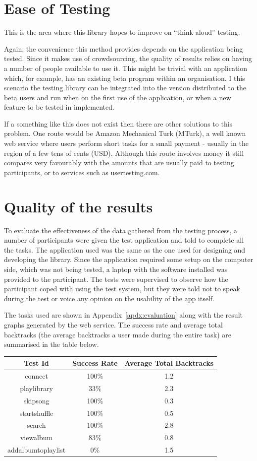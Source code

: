 \section{Ease of Testing}

This is the area where this library hopes to improve on ``think
aloud'' testing.

Again, the convenience this method provides depends on the application
being tested. Since it makes use of crowdsourcing, the quality of
results relies on having a number of people available to use it.
This might be trivial with an application which, for example, has
an existing beta program within an organisation. I this scenario
the testing library can be integrated into the version distributed
to the beta users and run when on the first use of the application,
or when a new feature to be tested in implemented.

If a something like this does not exist then there are other solutions
to this problem. One route would be Amazon Mechanical Turk (MTurk),
a well known web service where users perform short tasks for a small
payment - usually in the region of a few tens of cents (USD).
Although this route involves money it still compares very favourably
with the amounts that are usually paid to testing participants, or
to services such as usertesting.com.

\section{Quality of the results}

To evaluate the effectiveness of the data gathered from the testing
process, a number of participants were given the test application
and told to complete all the tasks. The application used was the
same as the one used for designing and developing the library.
Since the application required some setup on the computer side,
which was not being tested, a laptop with the software installed
was provided to the participant. The tests were supervised to observe
how the participant coped with using the test system, but they were told
not to speak during the test or voice any opinion on the usability
of the app itself.

The tasks used are shown in Appendix~\ref{apdx:evaluation} along
with the result graphs generated by the web service. The success
rate and average total backtracks (the average backtracks a user
made during the entire task) are summarised in the table below.


\begin{tabular}{| c | c | c |}
\hline
Test Id & Success Rate & Average Total Backtracks \\
\hline
connect & 100\% & 1.2 \\
playlibrary & 33\% & 2.3\\
skipsong & 100\% & 0.3 \\
startshuffle & 100\% & 0.5 \\
search & 100\% & 2.8 \\
viewalbum & 83\% & 0.8 \\
addalbumtoplaylist & 0\% & 1.5 \\
\hline
\end{tabular}

